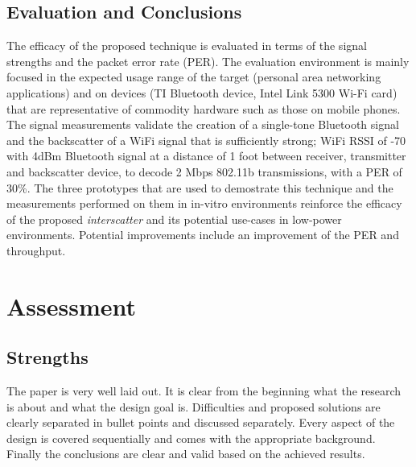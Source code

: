\documentclass[a4paper]{article}
\begin{document}
\subsection{Evaluation and Conclusions}
The efficacy of the proposed technique is evaluated in terms of the signal strengths and the packet error rate (PER). The evaluation environment is mainly focused in the expected usage range of the target (personal area networking applications) and on devices (TI Bluetooth device, Intel Link 5300 Wi-Fi card) that are representative of commodity hardware such as those on mobile phones. The signal measurements validate the creation of a single-tone Bluetooth signal and the backscatter of a WiFi signal that is sufficiently strong; WiFi RSSI of -70 with 4dBm Bluetooth signal at a distance of 1 foot between receiver, transmitter and backscatter device, to decode 2 Mbps 802.11b transmissions, with a PER of 30\%. 
The three prototypes that are used to demostrate this technique and the measurements performed on them in in-vitro environments reinforce the efficacy of the proposed \textit{interscatter} and its potential use-cases in low-power environments. Potential improvements include an improvement of the PER and throughput.

\section{Assessment}
\subsection{Strengths}
The paper is very well laid out. It is clear from the beginning what the research is about and what the design goal is. Difficulties and proposed solutions are clearly separated in bullet points and discussed separately. Every aspect of the design is covered sequentially and comes with the appropriate background. Finally the conclusions are clear and valid based on the achieved results.
\end{document}
